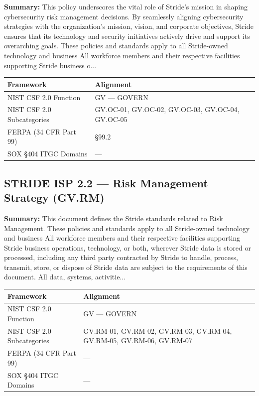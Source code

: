 \documentclass[11pt,landscape]{article}
\begin{document}
\textbf{Summary:} This policy underscores the vital role of Stride’s mission in shaping cybersecurity risk management decisions. By seamlessly aligning cybersecurity strategies with the organization's mission, vision, and corporate objectives, Stride ensures that its technology and security initiatives actively drive and support its overarching goals. These policies and standards apply to all Stride-owned technology and business All workforce members and their respective facilities supporting Stride business o...

\begin{tabularx}{\textwidth}{|p{4cm}|X|}
\hline
\rowcolor{headgray} \textbf{Framework} & \textbf{Alignment} \\
\hline
NIST CSF 2.0 Function & GV --- GOVERN \\
\hline
NIST CSF 2.0 Subcategories & GV.OC-01, GV.OC-02, GV.OC-03, GV.OC-04, GV.OC-05 \\
\hline
FERPA (34 CFR Part 99) & §99.2 \\
\hline
SOX §404 ITGC Domains & --- \\
\hline
\end{tabularx}


\subsection{\textcolor{strideblue}{STRIDE ISP 2.2} --- Risk Management Strategy (GV.RM)}
\label{pol:ISP22}

\textbf{Summary:} This document defines the Stride standards related to Risk Management. These policies and standards apply to all Stride-owned technology and business All workforce members and their respective facilities supporting Stride business operations, technology, or both, wherever Stride data is stored or processed, including any third party contracted by Stride to handle, process, transmit, store, or dispose of Stride data are subject to the requirements of this document. All data, systems, activitie...

\begin{tabularx}{\textwidth}{|p{4cm}|X|}
\hline
\rowcolor{headgray} \textbf{Framework} & \textbf{Alignment} \\
\hline
NIST CSF 2.0 Function & GV --- GOVERN \\
\hline
NIST CSF 2.0 Subcategories & GV.RM-01, GV.RM-02, GV.RM-03, GV.RM-04, GV.RM-05, GV.RM-06, GV.RM-07 \\
\hline
FERPA (34 CFR Part 99) & --- \\
\hline
SOX §404 ITGC Domains & --- \\
\hline
\end{tabularx}
\end{document}
